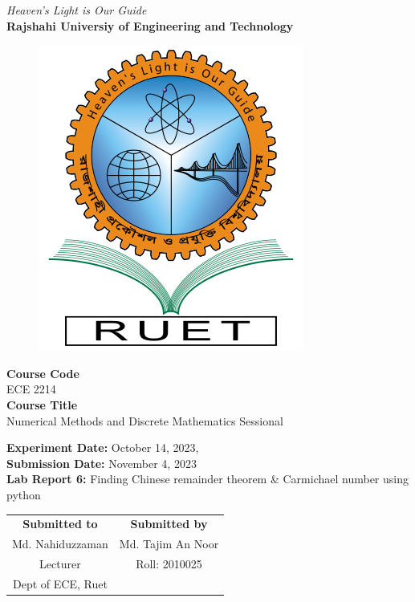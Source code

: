 \vspace*{\fill}
\begin{center}

    \emph{Heaven's Light is Our Guide} \\
    \textbf{Rajshahi Universiy of Engineering and Technology} \\

    \begin{figure}[H]
        \centering
        \includegraphics[scale=.34]{images/RUET_logo.png}
        \label{fig:ruet_logo}
    \end{figure}
    \vspace{5mm}

    \textbf{Course Code}\\
    ECE 2214\\
    \vspace{3mm}
    \textbf{Course Title}\\
    Numerical Methods and Discrete Mathematics Sessional

    \vspace{5mm}
    \textbf{Experiment Date:} October 14, 2023,\\
    \textbf{Submission Date:} {November 4, 2023}\\

    \vspace{5mm}
    \textbf{Lab Report 6:} Finding Chinese remainder theorem \& Carmichael number using python

    \vspace{15mm}

    \begin{tabular}{c|c}
        \textbf{Submitted to} & \textbf{Submitted by} \\
        Md. Nahiduzzaman      & Md. Tajim An Noor     \\
        Lecturer              & Roll: 2010025         \\
        Dept of ECE, Ruet     &                       \\
    \end{tabular}

\end{center}
\vspace*{\fill}
